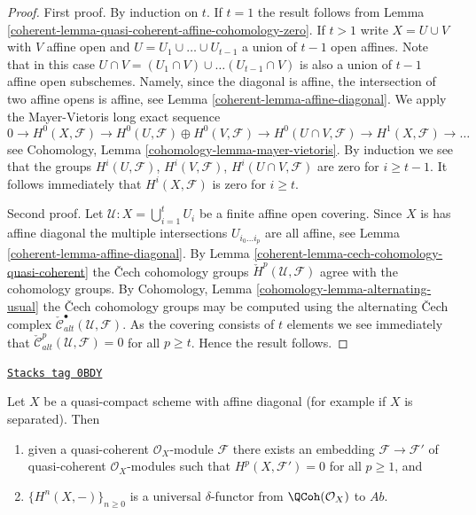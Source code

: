 \begin{proof}

First proof.
By induction on $t$.
If $t = 1$ the result follows from
Lemma \ref{coherent-lemma-quasi-coherent-affine-cohomology-zero}.
If $t > 1$ write $X = U \cup V$ with $V$ affine open and
$U = U_1 \cup \ldots \cup U_{t - 1}$ a union of $t - 1$ open affines.
Note that in this case
$U \cap V =  (U_1 \cap V) \cup \ldots (U_{t - 1} \cap V)$
is also a union of $t - 1$ affine open subschemes.
Namely, since the diagonal is affine, the intersection of two
affine opens is affine, see Lemma \ref{coherent-lemma-affine-diagonal}.
We apply the Mayer-Vietoris long exact sequence
$$
0 \to
H^0(X, \mathcal{F}) \to
H^0(U, \mathcal{F}) \oplus H^0(V, \mathcal{F}) \to
H^0(U \cap V, \mathcal{F}) \to
H^1(X, \mathcal{F}) \to \ldots
$$
see Cohomology, Lemma \ref{cohomology-lemma-mayer-vietoris}.
By induction we see that the groups $H^i(U, \mathcal{F})$,
$H^i(V, \mathcal{F})$, $H^i(U \cap V, \mathcal{F})$ are zero for
$i \geq t - 1$. It follows immediately that $H^i(X, \mathcal{F})$
is zero for $i \geq t$.

\medskip\noindent
Second proof.
Let $\mathcal{U} : X = \bigcup_{i = 1}^t U_i$ be a finite affine open
covering. Since $X$ is has affine diagonal the multiple intersections
$U_{i_0 \ldots i_p}$ are all affine, see
Lemma \ref{coherent-lemma-affine-diagonal}.
By Lemma \ref{coherent-lemma-cech-cohomology-quasi-coherent} the {\v C}ech
cohomology groups $\check{H}^p(\mathcal{U}, \mathcal{F})$
agree with the cohomology groups. By
Cohomology, Lemma \ref{cohomology-lemma-alternating-usual}
the {\v C}ech cohomology groups may be computed using the alternating
{\v C}ech complex $\check{\mathcal{C}}_{alt}^\bullet(\mathcal{U}, \mathcal{F})$.
As the covering consists of $t$ elements we see immediately
that $\check{\mathcal{C}}_{alt}^p(\mathcal{U}, \mathcal{F}) = 0$
for all $p \geq t$. Hence the result follows.
\end{proof}

\begin{lemma}
\label{coherent-lemma-affine-diagonal-universal-delta-functor}
\href{https://stacks.math.columbia.edu/tag/0BDY}{\texttt{Stacks tag 0BDY}}

Let $X$ be a quasi-compact scheme with affine diagonal
(for example if $X$ is separated). Then
\begin{enumerate}
\item given a quasi-coherent $\mathcal{O}_X$-module $\mathcal{F}$
there exists an embedding $\mathcal{F} \to \mathcal{F}'$ of
quasi-coherent $\mathcal{O}_X$-modules
such that $H^p(X, \mathcal{F}') = 0$ for all $p \geq 1$, and
\item $\{H^n(X, -)\}_{n \geq 0}$
is a universal $\delta$-functor from $\QCoh(\mathcal{O}_X)$ to
$\textit{Ab}$.
\end{enumerate}
\end{lemma}

